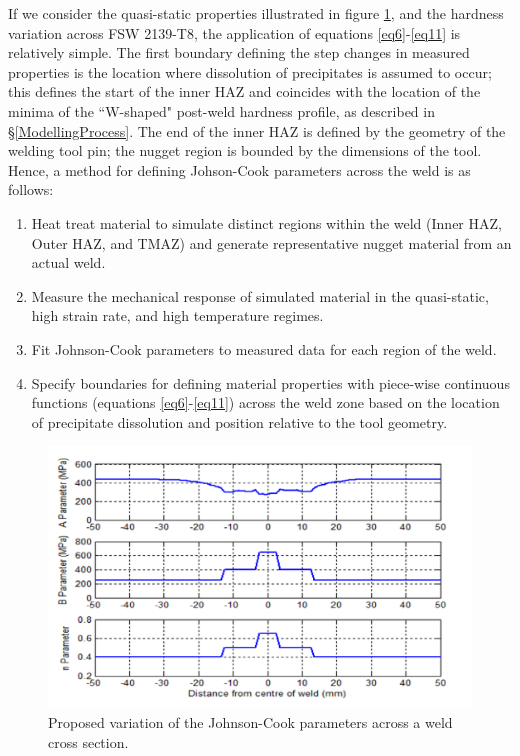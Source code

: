 	If we consider the quasi-static properties illustrated in figure \ref{fig:MechpropsVar}, and the hardness variation across FSW 2139-T8, the application of equations \ref{eq6}-\ref{eq11} is relatively simple. The first boundary defining the step changes in measured properties is the location where dissolution of precipitates is assumed to occur; this defines the start of the inner HAZ and coincides with the location of the minima of the ``W-shaped" post-weld hardness profile, as described in \S\ref{ModellingProcess}. The end of the inner HAZ is defined by the geometry of the welding tool pin; the nugget region is bounded by the dimensions of the tool. Hence, a method for defining Johson-Cook parameters across the weld is as follows:
	\begin{enumerate}
		\item Heat treat material to simulate distinct regions within the weld (Inner HAZ, Outer HAZ, and TMAZ) and generate representative nugget material from an actual weld.
		\item Measure the mechanical response of simulated material in the quasi-static, high strain rate, and high temperature regimes.
		\item Fit Johnson-Cook parameters to measured data for each region of the weld.
		\item Specify boundaries for defining material properties with piece-wise continuous functions (equations \ref{eq6}-\ref{eq11}) across the weld zone based on the location of precipitate dissolution and position relative to the tool geometry.
	\end{enumerate}  
	\begin{figure}
		\includegraphics[width=1\linewidth]{PropertyVariation} 
		\caption{Proposed variation of the Johnson-Cook parameters across a weld cross section.}
		\label{fig:MechpropsVar}
	\end{figure}	
